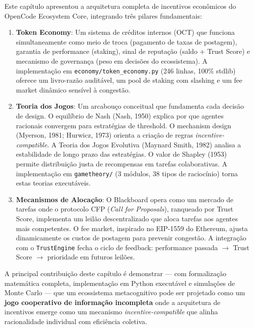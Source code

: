 Este capítulo apresentou a arquitetura completa de incentivos econômicos do OpenCode Ecosystem Core, integrando três pilares fundamentais:

\begin{enumerate}
    \item \textbf{Token Economy}: Um sistema de créditos internos (OCT) que funciona simultaneamente como meio de troca (pagamento de taxas de postagem), garantia de performance (staking), sinal de reputação (saldo + Trust Score) e mecanismo de governança (peso em decisões do ecossistema). A implementação em \texttt{economy/token\_economy.py} (246 linhas, 100\% stdlib) oferece um livro-razão auditável, um pool de staking com slashing e um fee market dinâmico sensível à congestão.
    
    \item \textbf{Teoria dos Jogos}: Um arcabouço conceitual que fundamenta cada decisão de design. O equilíbrio de Nash (Nash, 1950) explica por que agentes racionais convergem para estratégias de threshold. O mechanism design (Myerson, 1981; Hurwicz, 1973) orienta a criação de regras \textit{incentive-compatible}. A Teoria dos Jogos Evolutiva (Maynard Smith, 1982) analisa a estabilidade de longo prazo das estratégias. O valor de Shapley (1953) permite distribuição justa de recompensas em tarefas colaborativas. A implementação em \texttt{gametheory/} (3 módulos, 38 tipos de raciocínio) torna estas teorias executáveis.
    
    \item \textbf{Mecanismos de Alocação}: O Blackboard opera como um mercado de tarefas onde o protocolo CFP (\textit{Call for Proposals}), ranqueado por Trust Score, implementa um leilão descentralizado que aloca tarefas aos agentes mais competentes. O fee market, inspirado no EIP-1559 do Ethereum, ajusta dinamicamente os custos de postagem para prevenir congestão. A integração com o \texttt{TrustEngine} fecha o ciclo de feedback: performance passada $\to$ Trust Score $\to$ prioridade em futuros leilões.
\end{enumerate}

A principal contribuição deste capítulo é demonstrar --- com formalização matemática completa, implementação em Python executável e simulações de Monte Carlo --- que um ecossistema metacognitivo pode ser projetado como um \textbf{jogo cooperativo de informação incompleta} onde a arquitetura de incentivos emerge como um mecanismo \textit{incentive-compatible} que alinha racionalidade individual com eficiência coletiva.

